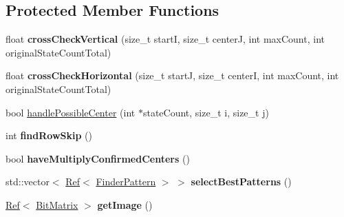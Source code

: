 \subsection*{Protected Member Functions}
\begin{DoxyCompactItemize}
\item 
\mbox{\label{classzxing_1_1qrcode_1_1_finder_pattern_finder_a3f2db818ba8c0380eedfaab2793829ff}} 
float {\bfseries cross\+Check\+Vertical} (size\+\_\+t startI, size\+\_\+t centerJ, int max\+Count, int original\+State\+Count\+Total)
\item 
\mbox{\label{classzxing_1_1qrcode_1_1_finder_pattern_finder_a10fd3a268f14fec65176cbbc1ac086a7}} 
float {\bfseries cross\+Check\+Horizontal} (size\+\_\+t startJ, size\+\_\+t centerI, int max\+Count, int original\+State\+Count\+Total)
\item 
bool \mbox{\hyperlink{classzxing_1_1qrcode_1_1_finder_pattern_finder_a757ba8b0853dea8f4244da44ea4ba58f}{handle\+Possible\+Center}} (int $\ast$state\+Count, size\+\_\+t i, size\+\_\+t j)
\item 
\mbox{\label{classzxing_1_1qrcode_1_1_finder_pattern_finder_a6e6e511988ce82adb21efe1b7e2d650f}} 
int {\bfseries find\+Row\+Skip} ()
\item 
\mbox{\label{classzxing_1_1qrcode_1_1_finder_pattern_finder_ad4407a7429a498ec9864164642bb72dc}} 
bool {\bfseries have\+Multiply\+Confirmed\+Centers} ()
\item 
\mbox{\label{classzxing_1_1qrcode_1_1_finder_pattern_finder_a0a7024d2704e15bf47aab3da3b7f52e9}} 
std\+::vector$<$ \mbox{\hyperlink{classzxing_1_1_ref}{Ref}}$<$ \mbox{\hyperlink{classzxing_1_1qrcode_1_1_finder_pattern}{Finder\+Pattern}} $>$ $>$ {\bfseries select\+Best\+Patterns} ()
\item 
\mbox{\label{classzxing_1_1qrcode_1_1_finder_pattern_finder_a30b0065c0ec46db572e5db22d416fb21}} 
\mbox{\hyperlink{classzxing_1_1_ref}{Ref}}$<$ \mbox{\hyperlink{classzxing_1_1_bit_matrix}{Bit\+Matrix}} $>$ {\bfseries get\+Image} ()

\end{DoxyCompactItemize}
